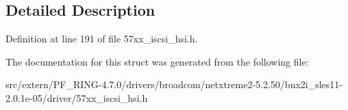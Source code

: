 \subsection{Detailed Description}


Definition at line 191 of file 57xx\_\-iscsi\_\-hsi.h.



The documentation for this struct was generated from the following file:\begin{DoxyCompactItemize}
\item 
src/extern/PF\_\-RING-\/4.7.0/drivers/broadcom/netxtreme2-\/5.2.50/bnx2i\_\-sles11-\/2.0.1e-\/05/driver/57xx\_\-iscsi\_\-hsi.h\end{DoxyCompactItemize}
